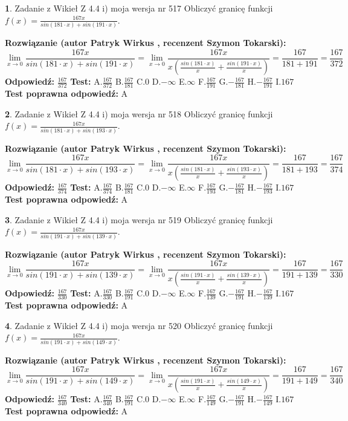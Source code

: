 \documentclass[12pt, a4paper]{article}
\theoremstyle{definition} %
\newtheorem{zad}{}
\newcommand{\zadStart}[1]{\begin{zad}#1\newline}
\newcommand{\zadStop}{\end{zad}}
\newcommand{\rozwStart}[2]{\noindent \textbf{Rozwiązanie (autor #1 , recenzent #2): }\newline}
\newcommand{\rozwStop}{\newline}
\newcommand{\odpStart}{\noindent \textbf{Odpowiedź:}\newline}
\newcommand{\odpStop}{\newline}
\newcommand{\testStart}{\noindent \textbf{Test:}\newline}
\newcommand{\testStop}{\newline}
\newcommand{\kluczStart}{\noindent \textbf{Test poprawna odpowiedź:}\newline}
\newcommand{\kluczStop}{\newline}
\begin{document}
\zadStart{Zadanie z Wikieł Z 4.4 i) moja wersja nr 517}
Obliczyć granicę funkcji $f(x)=\frac{167x}{sin(181\cdot x) +sin(191\cdot x)}$.
\zadStop
\rozwStart{Patryk Wirkus}{Szymon Tokarski}
$$\lim\limits_{x\to 0}\frac{167x}{sin(181\cdot x) +sin(191\cdot x)}=\lim\limits_{x\to 0}\frac{167x}{x(\frac{sin(181\cdot x)}{x}+\frac{sin(191\cdot x)}{x})}=\frac{167}{181+191} = \frac{167}{372}$$
\rozwStop
\odpStart
$\frac{167}{372}$
\odpStop
\testStart
A.$\frac{167}{372}$
B.$\frac{167}{181}$
C.$0$
D.$-\infty$
E.$\infty$
F.$\frac{167}{191}$
G.$-\frac{167}{181}$
H.$-\frac{167}{191}$
I.$167$
\testStop
\kluczStart
A
\kluczStop



\zadStart{Zadanie z Wikieł Z 4.4 i) moja wersja nr 518}
Obliczyć granicę funkcji $f(x)=\frac{167x}{sin(181\cdot x) +sin(193\cdot x)}$.
\zadStop
\rozwStart{Patryk Wirkus}{Szymon Tokarski}
$$\lim\limits_{x\to 0}\frac{167x}{sin(181\cdot x) +sin(193\cdot x)}=\lim\limits_{x\to 0}\frac{167x}{x(\frac{sin(181\cdot x)}{x}+\frac{sin(193\cdot x)}{x})}=\frac{167}{181+193} = \frac{167}{374}$$
\rozwStop
\odpStart
$\frac{167}{374}$
\odpStop
\testStart
A.$\frac{167}{374}$
B.$\frac{167}{181}$
C.$0$
D.$-\infty$
E.$\infty$
F.$\frac{167}{193}$
G.$-\frac{167}{181}$
H.$-\frac{167}{193}$
I.$167$
\testStop
\kluczStart
A
\kluczStop



\zadStart{Zadanie z Wikieł Z 4.4 i) moja wersja nr 519}
Obliczyć granicę funkcji $f(x)=\frac{167x}{sin(191\cdot x) +sin(139\cdot x)}$.
\zadStop
\rozwStart{Patryk Wirkus}{Szymon Tokarski}
$$\lim\limits_{x\to 0}\frac{167x}{sin(191\cdot x) +sin(139\cdot x)}=\lim\limits_{x\to 0}\frac{167x}{x(\frac{sin(191\cdot x)}{x}+\frac{sin(139\cdot x)}{x})}=\frac{167}{191+139} = \frac{167}{330}$$
\rozwStop
\odpStart
$\frac{167}{330}$
\odpStop
\testStart
A.$\frac{167}{330}$
B.$\frac{167}{191}$
C.$0$
D.$-\infty$
E.$\infty$
F.$\frac{167}{139}$
G.$-\frac{167}{191}$
H.$-\frac{167}{139}$
I.$167$
\testStop
\kluczStart
A
\kluczStop



\zadStart{Zadanie z Wikieł Z 4.4 i) moja wersja nr 520}
Obliczyć granicę funkcji $f(x)=\frac{167x}{sin(191\cdot x) +sin(149\cdot x)}$.
\zadStop
\rozwStart{Patryk Wirkus}{Szymon Tokarski}
$$\lim\limits_{x\to 0}\frac{167x}{sin(191\cdot x) +sin(149\cdot x)}=\lim\limits_{x\to 0}\frac{167x}{x(\frac{sin(191\cdot x)}{x}+\frac{sin(149\cdot x)}{x})}=\frac{167}{191+149} = \frac{167}{340}$$
\rozwStop
\odpStart
$\frac{167}{340}$
\odpStop
\testStart
A.$\frac{167}{340}$
B.$\frac{167}{191}$
C.$0$
D.$-\infty$
E.$\infty$
F.$\frac{167}{149}$
G.$-\frac{167}{191}$
H.$-\frac{167}{149}$
I.$167$
\testStop
\kluczStart
A
\kluczStop
\end{document}
